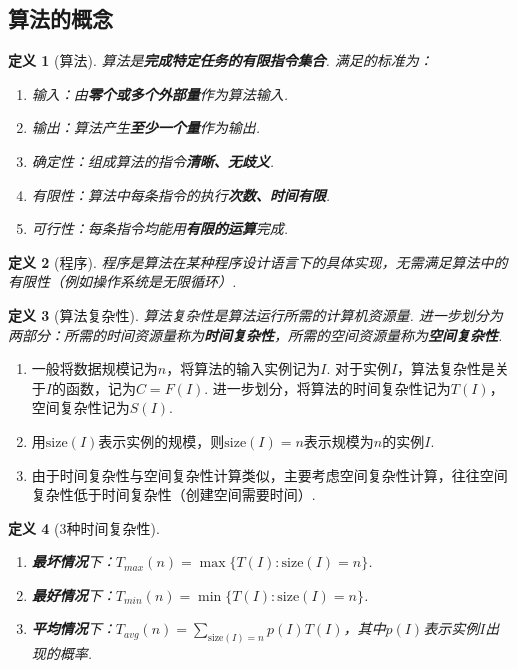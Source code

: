 \documentclass[12pt, a4paper, oneside]{ctexart}
\newtheorem{definition}{定义}[section]
\numberwithin{equation}{section}  %
\theoremstyle{definition}
\newenvironment{remark}{\begin{enumerate}[label=\textbf{注\arabic*.}]}{\end{enumerate}}
\begin{document}
\subsection{算法的概念}
\begin{definition}[算法]
    算法是\textbf{完成特定任务的有限指令集合}. 
    满足的标准为：
    \begin{enumerate}
        \item 输入：由\textbf{零个或多个外部量}作为算法输入.
        \item 输出：算法产生\textbf{至少一个量}作为输出.
        \item 确定性：组成算法的指令\textbf{清晰、无歧义}.
        \item 有限性：算法中每条指令的执行\textbf{次数、时间有限}.
        \item 可行性：每条指令均能用\textbf{有限的运算}完成.
    \end{enumerate}
\end{definition}
\begin{definition}[程序]
    程序是算法在某种程序设计语言下的具体实现，无需满足算法中的有限性（例如操作系统是无限循环）.
\end{definition}
\begin{definition}[算法复杂性]
    算法复杂性是算法运行所需的计算机资源量. 
    进一步划分为两部分：所需的时间资源量称为\textbf{时间复杂性}，所需的空间资源量称为\textbf{空间复杂性}.
\end{definition}
\begin{remark}
    \item 一般将数据规模记为$n$，将算法的输入实例记为$I$. 对于实例$I$，算法复杂性是关于$I$的函数，记为$C=F(I)$. 进一步划分，将算法的时间复杂性记为$T(I)$，空间复杂性记为$S(I)$.
    \item 用$\text{size}(I)$表示实例的规模，则$\text{size}(I) = n$表示规模为$n$的实例$I$.
    \item 由于时间复杂性与空间复杂性计算类似，主要考虑空间复杂性计算，往往空间复杂性低于时间复杂性（创建空间需要时间）.
\end{remark}
\begin{definition}[3种时间复杂性]\ 
    \begin{enumerate}
        \item \textbf{最坏情况}下：$T_{max}(n) = \max\{T(I):\textrm{size}(I) = n\}$.
        \item \textbf{最好情况}下：$T_{min}(n) = \min\{T(I):\textrm{size}(I) = n\}$.
        \item \textbf{平均情况}下：$T_{avg}(n) = \sum_{\textrm{size}(I) = n}p(I)T(I)$，其中$p(I)$表示实例$I$出现的概率.
    \end{enumerate}
\end{definition}
\end{document}
